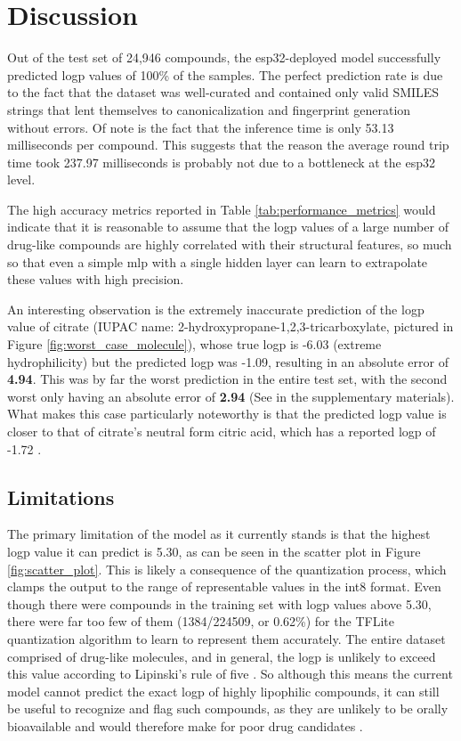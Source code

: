 \chapter{Discussion}

Out of the test set of 24,946 compounds, the \gls{esp32}-deployed model successfully predicted \gls{logp} values of 100\% of the samples. 
The perfect prediction rate is due to the fact that the dataset was well-curated and contained only valid SMILES strings that lent themselves to canonicalization and fingerprint generation without errors. 
Of note is the fact that the inference time is only 53.13 milliseconds per compound. This suggests that the reason the average round trip time took 237.97 milliseconds is probably not due to a bottleneck at the \gls{esp32} level.

The high accuracy metrics reported in Table \ref{tab:performance_metrics} would indicate that it is reasonable to assume that the \gls{logp} values of a large number of drug-like compounds are highly correlated with their structural features,
so much so that even a simple \gls{mlp} with a single hidden layer can learn to extrapolate these values with high precision.

An interesting observation is the extremely inaccurate prediction of the \gls{logp} value of citrate (IUPAC name: 2-hydroxypropane-1,2,3-tricarboxylate, pictured in Figure \ref{fig:worst_case_molecule}), whose true \gls{logp} is -6.03 (extreme \gls{hydrophilicity}) but the predicted \gls{logp} was -1.09, resulting in an absolute error of \textbf{4.94}.
This was by far the worst prediction in the entire test set, with the second worst only having an absolute error of \textbf{2.94} (See  in the supplementary materials).
What makes this case particularly noteworthy is that the predicted \gls{logp} value is closer to that of citrate's neutral form citric acid, which has a reported \gls{logp} of -1.72 \cite{citricacid}.

\section{Limitations}

The primary limitation of the model as it currently stands is that the highest \gls{logp} value it can predict is 5.30, as can be seen in the scatter plot in Figure \ref{fig:scatter_plot}.
This is likely a consequence of the quantization process, which clamps the output to the range of representable values in the int8 format.
Even though there were compounds in the training set with \gls{logp} values above 5.30, there were far too few of them (1384/224509, or 0.62\%) for the TFLite quantization algorithm to learn to represent them accurately.
The entire dataset comprised of drug-like molecules, and in general, the \gls{logp} is unlikely to exceed this value according to Lipinski's rule of five \cite{lipinski2001polar}.
So although this means the current model cannot predict the exact \gls{logp} of highly lipophilic compounds, it can still be useful to recognize and flag such compounds, 
as they are unlikely to be orally bioavailable and would therefore make for poor drug candidates \cite{lipinski2004lead}.